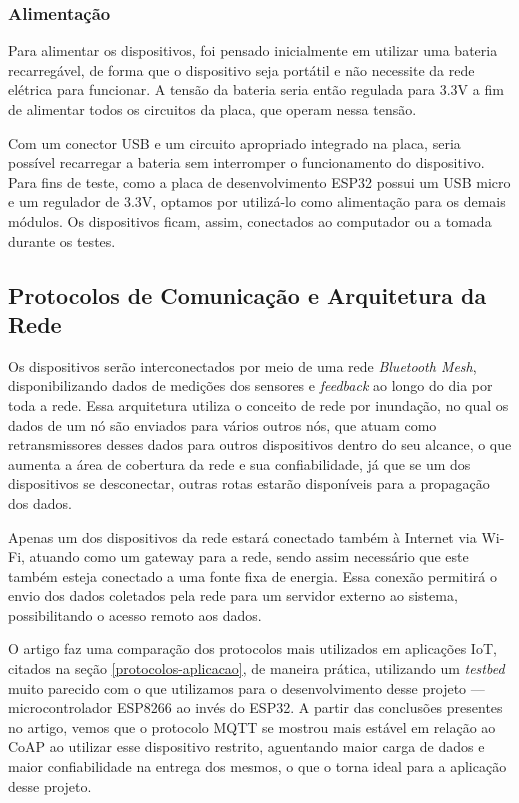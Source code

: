 \documentclass[../monografia.tex]{subfiles}
\begin{document}
\subsubsection{Alimentação}

Para alimentar os dispositivos, foi pensado inicialmente em utilizar uma bateria recarregável, de forma que o dispositivo seja portátil e não necessite da rede elétrica para funcionar. A tensão da bateria seria então regulada para 3.3V a fim de alimentar todos os circuitos da placa, que operam nessa tensão. 

Com um conector USB e um circuito apropriado integrado na placa, seria possível recarregar a bateria sem interromper o funcionamento do dispositivo. Para fins de teste, como a placa de desenvolvimento ESP32 possui um USB micro e um regulador de 3.3V, optamos por utilizá-lo como alimentação para os demais módulos. Os dispositivos ficam, assim, conectados ao computador ou a tomada durante os testes.

\subsection{Protocolos de Comunicação e Arquitetura da Rede}

Os dispositivos serão interconectados por meio de uma rede \textit{Bluetooth Mesh}, disponibilizando dados de medições dos sensores e \textit{feedback} ao longo do dia por toda a rede. Essa arquitetura utiliza o conceito de rede por inundação, no qual os dados de um nó são enviados para vários outros nós, que atuam como retransmissores desses dados para outros dispositivos dentro do seu alcance, o que aumenta a área de cobertura da rede e sua confiabilidade, já que se um dos dispositivos se desconectar, outras rotas estarão disponíveis para a propagação dos dados.

Apenas um dos dispositivos da rede estará conectado também à Internet via Wi-Fi, atuando como um gateway para a rede, sendo assim necessário que este também esteja conectado a uma fonte fixa de energia. Essa conexão permitirá o envio dos dados coletados pela rede para um servidor externo ao sistema, possibilitando o acesso remoto aos dados.

O artigo \cite{analise-protocolos-iot} faz uma comparação dos protocolos mais utilizados em aplicações IoT, citados na seção \ref{protocolos-aplicacao}, de maneira prática, utilizando um \textit{testbed} muito parecido com o que utilizamos para o desenvolvimento desse projeto --- microcontrolador ESP8266 ao invés do ESP32. A partir das conclusões presentes no artigo, vemos que o protocolo MQTT se mostrou mais estável em relação ao CoAP ao utilizar esse dispositivo restrito, aguentando maior carga de dados e maior confiabilidade na entrega dos mesmos, o que o torna ideal para a aplicação desse projeto.
\end{document}
